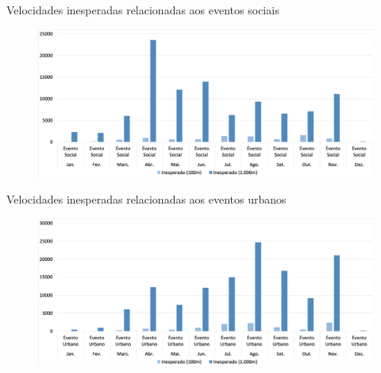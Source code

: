 \documentclass{beamer}
\begin{document}
\begin{frame}{Velocidades inesperadas relacionadas aos eventos sociais}
\begin{figure}[!htb]
	\centering
		\includegraphics[width=1\linewidth]{apriori_analysis_shapes_social_events_.png}
	\label{fig:apriori_analysis_shapes_social_events}
\end{figure}
\end{frame}
\begin{frame}{Velocidades inesperadas relacionadas aos eventos urbanos}
    \begin{figure}[!htb]
	\centering
		\includegraphics[width=1\linewidth]{apriori_analysis_shapes_urban_events_.png}
	\label{fig:apriori_analysis_shapes_urban_events}
\end{figure}
\end{frame}
\end{document}
